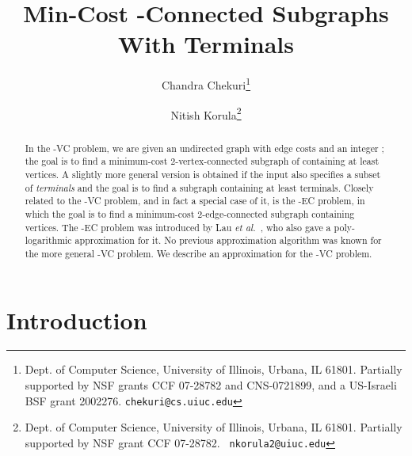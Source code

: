 \documentclass[11pt]{article}
\newcommand{\etal}{{\em et al.}\ }
\newcommand{\kec}[1]{-{\sc EC} }
\newcommand{\kvc}[1]{-{\sc VC} }
\newcommand{\ke}{\kec{2}}
\newcommand{\kv}{\kvc{2}}
\begin{document}
\title{Min-Cost -Connected Subgraphs With  Terminals}
\author{
  Chandra Chekuri\thanks{Dept. of Computer Science, University of Illinois, Urbana,
    IL 61801. Partially supported by NSF grants CCF 07-28782 and CNS-0721899, and a
    US-Israeli BSF grant 2002276. {\tt chekuri@cs.uiuc.edu}}
  \and 
  Nitish Korula\thanks{Dept. of Computer Science, University of Illinois, Urbana,
    IL 61801.  Partially supported by NSF grant CCF 07-28782. {\tt
      nkorula2@uiuc.edu}} }
\date{}
\maketitle

\begin{abstract}
  In the \kv problem, we are given an undirected graph  with edge
  costs and an integer ; the goal is to find a minimum-cost
  2-vertex-connected subgraph of  containing at least 
  vertices. A slightly more general version is obtained if the
  input also specifies a subset  of {\em terminals} and
  the goal is to find a subgraph containing at least  terminals.
  Closely related to the \kv problem, and in fact a special case of
  it, is the \ke problem, in which the goal is to find a minimum-cost
  2-edge-connected subgraph containing  vertices. The \ke problem
  was introduced by Lau \etal \cite{LauNSS07}, who also gave a
  poly-logarithmic approximation for it. No previous approximation
  algorithm was known for the more general \kv problem.  We describe
  an  approximation for the \kv problem.
\end{abstract}

\section{Introduction}
\label{sec:intro}
\end{document}
